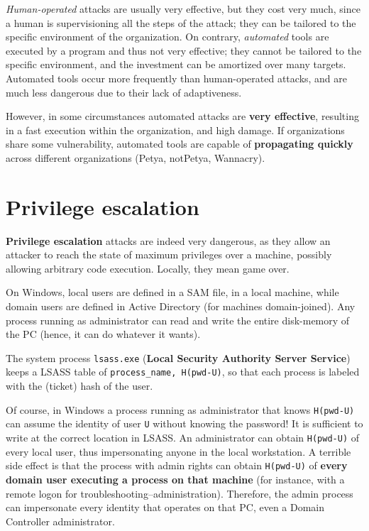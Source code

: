 \documentclass[10pt]{extreport}
\begin{document}
\emph{Human\--operated} attacks are usually very effective, but they cost very
much, since a human is supervisioning all the steps of the attack; they can be
tailored to the specific environment of the organization. On contrary,
\emph{automated} tools are executed by a program and thus not very effective;
they cannot be tailored to the specific environment, and the investment can be
amortized over many targets. Automated tools occur more frequently than
human\--operated attacks, and are much less dangerous due to their lack of
adaptiveness.

However, in some circumstances automated attacks are \textbf{very effective},
resulting in a fast execution within the organization, and high damage. If
organizations share some vulnerability, automated tools are capable of
\textbf{propagating quickly} across different organizations (Petya, notPetya,
Wannacry).

\section{Privilege escalation}

\textbf{Privilege escalation} attacks are indeed very dangerous, as they allow
an attacker to reach the state of maximum privileges over a machine, possibly
allowing arbitrary code execution. Locally, they mean game over.

On Windows, local users are defined in a SAM file, in a local machine, while
domain users are defined in Active Directory (for machines domain\--joined).
Any process running as administrator can read and write the entire
disk\--memory of the PC (hence, it can do whatever it wants).

The system process \texttt{lsass.exe} (\textbf{Local Security Authority Server
Service}) keeps a LSASS table of \texttt{process\_name, H(pwd-U)}, so that each
process is labeled with the (ticket) hash of the user.

Of course, in Windows a process running as administrator that knows
\texttt{H(pwd-U)} can assume the identity of user \texttt{U} without knowing
the password! It is sufficient to write at the correct location in LSASS. An
administrator can obtain \texttt{H(pwd-U)} of every local user, thus
impersonating anyone in the local workstation. A terrible side effect is that
the process with admin rights can obtain \texttt{H(pwd-U)} of \textbf{every
domain user executing a process on that machine} (for instance, with a remote
logon for troubleshooting\---administration). Therefore, the admin process can
impersonate every identity that operates on that PC, even a Domain Controller
administrator.
\end{document}
